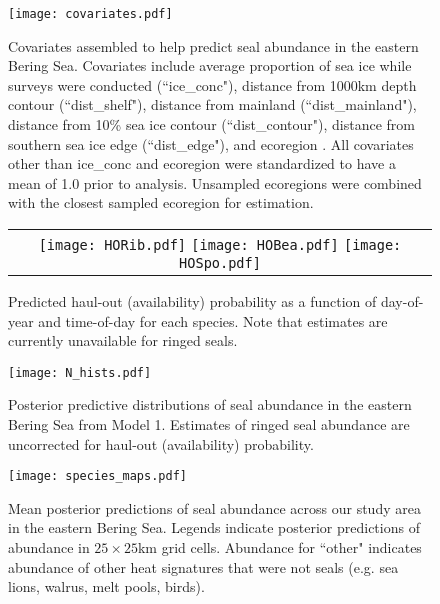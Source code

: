 \documentclass[12pt,fleqn]{article}
\begin{document}
\begin{flushleft}
\begin{figure}
\begin{center}
\texttt{[image: covariates.pdf]}
\end{center}
\caption{Covariates assembled to help predict seal abundance in the eastern Bering Sea. Covariates include average proportion of sea ice while surveys were conducted (``ice\_conc"), distance from 1000km depth contour (``dist\_shelf"), distance from mainland (``dist\_mainland"), distance from 10\% sea ice contour (``dist\_contour"), distance from southern sea ice edge (``dist\_edge"), and ecoregion \citep[see][]{PiattSpringer2007}.  All covariates other than ice\_conc and ecoregion were standardized to have a mean of 1.0 prior to analysis.  Unsampled ecoregions were combined with the closest sampled ecoregion for estimation. }
\label{fig:covs}
\end{figure}

\begin{figure}[htb!]
\begin{center}
\begin{tabular}{ c }
\texttt{[image: HORib.pdf]}
\texttt{[image: HOBea.pdf]}
\texttt{[image: HOSpo.pdf]}
\end{tabular}
\end{center}
\caption{Predicted haul-out (availability) probability as a function of day-of-year and time-of-day for each species.  Note that estimates are currently unavailable for ringed seals.}
\label{fig:HO}
\end{figure}

\begin{figure}
\begin{center}
\texttt{[image: N\_hists.pdf]}
\end{center}
\caption{Posterior predictive distributions of seal abundance in the eastern Bering Sea from Model 1.  Estimates of ringed seal abundance are uncorrected for haul-out (availability) probability.}
\label{fig:N}
\end{figure}

\begin{figure}
\begin{center}
\texttt{[image: species\_maps.pdf]}
\end{center}
\caption{Mean posterior predictions of seal abundance across our study area in the eastern Bering Sea.  Legends indicate posterior predictions of abundance in $25 \times 25$km grid cells.  Abundance for ``other" indicates abundance of other heat signatures that were not seals (e.g. sea lions, walrus, melt pools, birds).}
\label{fig:dists}
\end{figure}


\end{flushleft}
\end{document}
